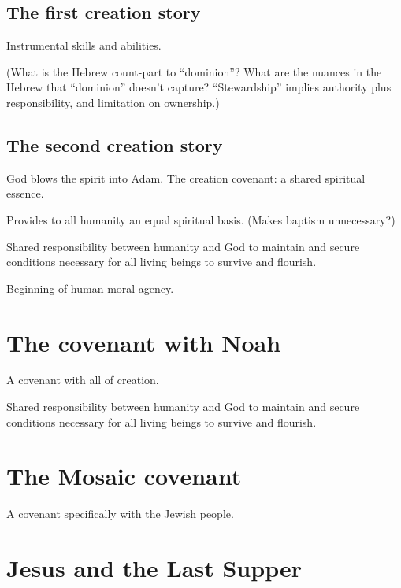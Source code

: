 \documentclass[
]{book}
\begin{document}
\hypertarget{the-first-creation-story}{%
\subsection{The first creation story}\label{the-first-creation-story}}

Instrumental skills and abilities.

(What is the Hebrew count-part to ``dominion''? What are the nuances in
the Hebrew that ``dominion'' doesn't capture? ``Stewardship'' implies
authority plus responsibility, and limitation on ownership.)

\hypertarget{the-second-creation-story}{%
\subsection{The second creation story}\label{the-second-creation-story}}

God blows the spirit into Adam.
The creation covenant: a shared spiritual essence.

Provides to all humanity an equal spiritual basis. (Makes baptism
unnecessary?)

Shared responsibility between humanity and God to maintain and secure
conditions necessary for all living beings to survive and flourish.

Beginning of human moral agency.

\hypertarget{the-covenant-with-noah}{%
\section{The covenant with Noah}\label{the-covenant-with-noah}}

A covenant with all of creation.

Shared responsibility between humanity and God to maintain and secure
conditions necessary for all living beings to survive and flourish.

\hypertarget{the-mosaic-covenant}{%
\section{The Mosaic covenant}\label{the-mosaic-covenant}}

A covenant specifically with the Jewish people.

\hypertarget{jesus-and-the-last-supper}{%
\section{Jesus and the Last Supper}\label{jesus-and-the-last-supper}}
\end{document}
